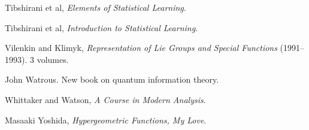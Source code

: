 \begin{thebibliography}{}
Tibshirani et al, \emph{Elements of Statistical Learning}.

Tibshirani et al, \emph{Introduction to Statistical Learning}.

Vilenkin and Klimyk, \emph{Representation of Lie Groups and Special Functions} (1991--1993). 3 volumes.

John Watrous. New book on quantum information theory.

Whittaker and Watson, \emph{A Course in Modern Analysis}.

Masaaki Yoshida, \emph{Hypergeometric Functions, My Love}.

\end{thebibliography}